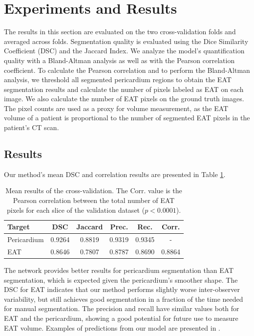 \section{Experiments and Results}\label{experiment}

The results in this section are evaluated on the two cross-validation folds and averaged across folds. Segmentation quality is evaluated using the Dice Similarity Coefficient (DSC) and the Jaccard Index. We analyze the model's quantification quality with a Bland-Altman analysis \cite{MARTINBLAND1986307} as well as with the Pearson correlation coefficient. To calculate the Pearson correlation and to perform the Bland-Altman analysis, we threshold all segmented pericardium regions to obtain the EAT segmentation results and calculate the number of pixels labeled as EAT on each image. We also calculate the number of EAT pixels on the ground truth images. The pixel counts are used as a proxy for volume measurement, as the EAT volume of a patient is proportional to the number of segmented EAT pixels in the patient's CT scan.

\subsection{Results}

Our method's mean DSC and correlation results are presented in Table \ref{tab:results}. 

\begin{table}[h]
\renewcommand{\arraystretch}{1.4}
\caption{Mean results of the cross-validation. The Corr. value is the Pearson correlation between the total number of EAT pixels for each slice of the validation dataset ($p<0.0001$).}
\centering
\begin{tabularx}{\textwidth}{Xccccc} 
 Target & DSC & Jaccard & Prec. & Rec. & Corr. \\
 \hline
 Pericardium & 0.9264 & 0.8819 & 0.9319 & 0.9345 & - \\ 
 EAT & 0.8646 & 0.7807 & 0.8787 & 0.8690 & 0.8864 \\
\end{tabularx}
\label{tab:results}
\end{table}

The network provides better results for pericardium segmentation than EAT segmentation, which is expected given the pericardium's smoother shape. The DSC for EAT indicates that our method performs slightly worse inter-observer variability, but still achieves good segmentation in a fraction of the time needed for manual segmentation. The precision and recall have similar values both for EAT and the pericardium, showing a good potential for future use to measure EAT volume. Examples of predictions from our model are presented in .


